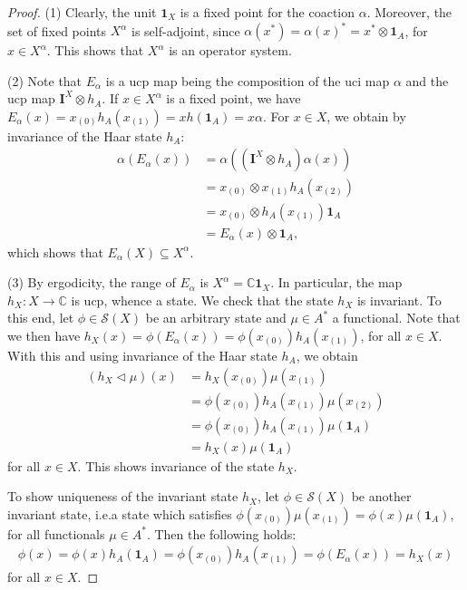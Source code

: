 \documentclass{amsart}
\theoremstyle{plain}
\theoremstyle{definition}
\theoremstyle{remark}
\begin{document}
	\begin{proof}
		(1)
		Clearly, the unit $\mathbf{1}_X$ is a fixed point for the coaction $\alpha$.
		Moreover, the set of fixed points $X^\alpha$ is self-adjoint, since $\alpha(x^*) = \alpha(x)^* = x^* \otimes \mathbf{1}_A$, for $x \in X^\alpha$.
		This shows that $X^\alpha$ is an operator system.
		
		(2)
		Note that $E_\alpha$ is a ucp map being the composition of the uci map $\alpha$ and the ucp map $\mathbf{I}^X \otimes h_A$.
		If $x \in X^\alpha$ is a fixed point, we have $E_\alpha(x) =x_{(0)} h_A(x_{(1)}) = x h(\mathbf{1}_A) = x\alpha$.
		For $x \in X$, we obtain by invariance of the Haar state $h_A$:
		\begin{align}
			\alpha(E_\alpha(x))
			&= \alpha \left( (\mathbf{I}^X \otimes h_A) \alpha (x) \right) \\
			&= x_{(0)} \otimes x_{(1)} h_A(x_{(2)}) \\
			&= x_{(0)} \otimes h_A(x_{(1)}) \mathbf{1}_A \\
			&= E_\alpha(x) \otimes \mathbf{1}_A,
		\end{align}
		which shows that $E_\alpha(X) \subseteq X^\alpha$.
		
		(3)
		By ergodicity, the range of $E_\alpha$ is $X^\alpha = \mathbb{C} \mathbf{1}_X$.
		In particular, the map $h_X : X \rightarrow \mathbb{C}$ is ucp, whence a state.
		We check that the state $h_X$ is invariant.
		To this end, let $\phi \in \mathcal{S}(X)$ be an arbitrary state and $\mu \in A^*$ a functional.
		Note that we then have $h_X(x) = \phi(E_\alpha(x)) = \phi(x_{(0)}) h_A(x_{(1)})$, for all $x \in X$.
		With this and using invariance of the Haar state $h_A$, we obtain
		\begin{align}
			(h_X \lhd \mu)(x)
			&= h_X(x_{(0)}) \mu(x_{(1)}) \\
			&= \phi(x_{(0)}) h_A(x_{(1)}) \mu(x_{(2)}) \\
			&= \phi(x_{(0)}) h_A(x_{(1)}) \mu(\mathbf{1}_A) \\
			&= h_X(x) \mu(\mathbf{1}_A)
		\end{align}
		for all $x \in X$.
		This shows invariance of the state $h_X$.
		
		To show uniqueness of the invariant state $h_X$, let $\phi \in \mathcal{S}(X)$ be another invariant state, i.e.\@ a state which satisfies $\phi(x_{(0)})\mu(x_{(1)}) = \phi(x)\mu(\mathbf{1}_A)$, for all functionals $\mu \in A^*$.
		Then the following holds:
		\begin{align}
			\phi(x)
			= \phi(x) h_A(\mathbf{1}_A)
			= \phi(x_{(0)}) h_A(x_{(1)})
			= \phi(E_\alpha(x))
			= h_X(x)
		\end{align}
		for all $x \in X$.
	\end{proof}
	
\end{document}

